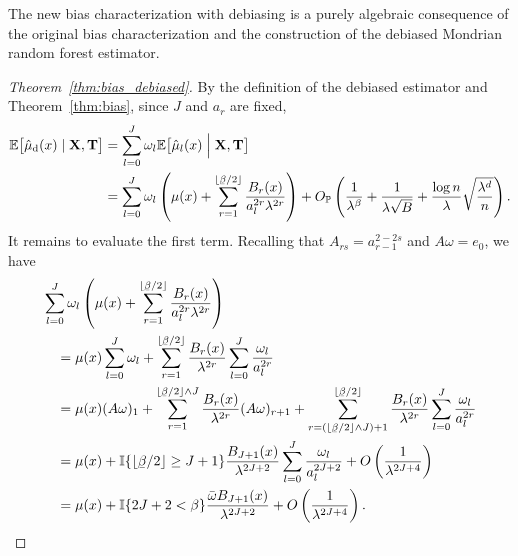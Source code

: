 The new bias characterization with debiasing is a purely algebraic
consequence of the original bias characterization and the construction
of the debiased Mondrian random forest estimator.

\begin{proof}[Theorem~\ref{thm:bias_debiased}]

  By the definition of the debiased estimator and Theorem~\ref{thm:bias},
  since $J$ and $a_r$ are fixed,
  \begin{align*}
    \E \big[ \hat \mu_\rd(x) \mid \bX, \bT \big]
    &=
    \sum_{l=0}^J
    \omega_l
    \E \big[
      \hat \mu_l(x)
      \Bigm| \bX, \bT
    \big] \\
    &=
    \sum_{l=0}^J
    \omega_l
    \left(
      \mu(x)
      + \sum_{r=1}^{\lfloor \flbeta / 2 \rfloor}
      \frac{B_r(x)}{a_l^{2r} \lambda^{2r}}
    \right)
    + O_\P \left(
      \frac{1}{\lambda^\beta}
      + \frac{1}{\lambda \sqrt B}
      + \frac{\log n}{\lambda} \sqrt{\frac{\lambda^d}{n}}
    \right).
  \end{align*}
  It remains to evaluate the first term.
  Recalling that $A_{r s} = a_{r-1}^{2 - 2s}$
  and $A \omega = e_0$, we have
  \begin{align*}
    &\sum_{l=0}^J
    \omega_l
    \left(
      \mu(x)
      + \sum_{r=1}^{\lfloor \flbeta / 2 \rfloor}
      \frac{B_r(x)}{a_l^{2r} \lambda^{2r}}
    \right) \\
    &\quad=
    \mu(x)
    \sum_{l=0}^J
    \omega_l
    +
    \sum_{r=1}^{\lfloor \flbeta / 2 \rfloor}
    \frac{B_r(x)}{\lambda^{2r}}
    \sum_{l=0}^J
    \frac{\omega_l}{a_l^{2r}} \\
    &\quad=
    \mu(x)
    (A \omega)_1
    + \sum_{r=1}^{\lfloor \flbeta / 2 \rfloor \wedge J}
    \frac{B_r(x)}{\lambda^{2r}}
    (A \omega)_{r+1}
    + \sum_{r = (\lfloor \flbeta / 2 \rfloor \wedge J) + 1}
    ^{\lfloor \flbeta / 2 \rfloor}
    \frac{B_r(x)}{\lambda^{2r}}
    \sum_{l=0}^J
    \frac{\omega_l}{a_l^{2r}} \\
    &\quad=
    \mu(x)
    + \I\{\lfloor \flbeta / 2 \rfloor \geq J + 1\}
    \frac{B_{J+1}(x)}{\lambda^{2J + 2}}
    \sum_{l=0}^J
    \frac{\omega_l}{a_l^{2J + 2}}
    + O \left( \frac{1}{\lambda^{2J + 4}} \right) \\
    &\quad=
    \mu(x)
    + \I\{2J + 2 < \beta\}
    \frac{\bar\omega B_{J+1}(x)}{\lambda^{2J + 2}}
    + O \left( \frac{1}{\lambda^{2J + 4}} \right).
  \end{align*}
\end{proof}

